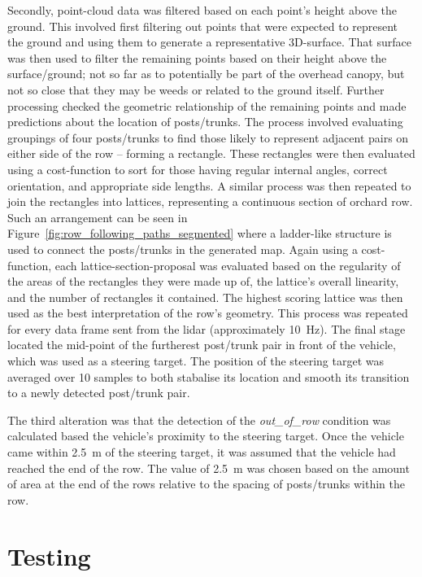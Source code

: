 \documentclass[preprint,authoryear,12pt]{elsarticle}
\begin{document}
      Secondly, point-cloud data was filtered based on each point's height above the ground.
      This involved first filtering out points that were expected to represent the ground and using them to generate a representative 3D-surface.
      That surface was then used to filter the remaining points based on their height above the surface/ground; not so far as to potentially be part of the overhead canopy, but not so close that they may be weeds or related to the ground itself.
      Further processing checked the geometric relationship of the remaining points and made predictions about the location of posts/trunks.
      The process involved evaluating groupings of four posts/trunks to find those likely to represent adjacent pairs on either side of the row -- forming a rectangle.
      These rectangles were then evaluated using a cost-function to sort for those having regular internal angles, correct orientation, and appropriate side lengths.
      A similar process was then repeated to join the rectangles into lattices, representing a continuous section of orchard row.
      Such an arrangement can be seen in Figure~\ref{fig:row_following_paths_segmented} where a ladder-like structure is used to connect the posts/trunks in the generated map.
      Again using a cost-function, each lattice-section-proposal was evaluated based on the regularity of the areas of the rectangles they were made up of, the lattice's overall linearity, and the number of rectangles it contained.
      The highest scoring lattice was then used as the best interpretation of the row's geometry.
      This process was repeated for every data frame sent from the lidar (approximately \SI{10}{\hertz}).
      The final stage located the mid-point of the furtherest post/trunk pair in front of the vehicle, which was used as a steering target.
      The position of the steering target was averaged over 10 samples to both stabalise its location and smooth its transition to a newly detected post/trunk pair.

      The third alteration was that the detection of the \textit{out\_of\_row} condition was calculated based the vehicle's proximity to the steering target.
      Once the vehicle came within \SI{2.5}{\meter} of the steering target, it was assumed that the vehicle had reached the end of the row.
      The value of \SI{2.5}{\meter} was chosen based on the amount of area at the end of the rows relative to the spacing of posts/trunks within the row.
\section{Testing}
\label{sub:testing}
\end{document}

